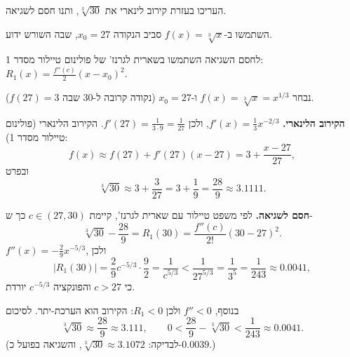 
\begin{question}
העריכו בעזרת קירוב לינארי את $\sqrt[3]{30}$, ותנו חסם לשגיאה.
\end{question}

\begin{hint}
השתמשו ב-$f(x)=\sqrt[3]{x}$ סביב הנקודה $x_0=27$, שבה השורש ידוע.
\end{hint}

\begin{hint}
לחסם השגיאה השתמשו בשארית לגרנז' של פולינום טיילור מסדר 1: $R_1(x)=\frac{f''(c)}{2}(x-x_0)^2$.
\end{hint}

\begin{solution}
נבחר $f(x)=\sqrt[3]{x}=x^{1/3}$ ו-$x_0=27$ (נקודה קרובה ל-$30$ שבה $f(27)=3$).

\textbf{הקירוב הלינארי.} $f'(x)=\frac13x^{-2/3}$, ולכן $f'(27)=\frac{1}{3\cdot 9}=\frac1{27}$. הקירוב הלינארי (פולינום טיילור מסדר 1):
\[ f(x)\approx f(27)+f'(27)(x-27)=3+\frac{x-27}{27}, \]
ובפרט
\[ \sqrt[3]{30}\approx 3+\frac{3}{27}=3+\frac19=\frac{28}{9}\approx 3.1111. \]

\textbf{חסם לשגיאה.} לפי משפט טיילור עם שארית לגרנז', קיימת $c\in(27,30)$ כך ש-
\[ \sqrt[3]{30}-\frac{28}{9} = R_1(30) = \frac{f''(c)}{2!}(30-27)^2. \]
$f''(x)=-\frac29x^{-5/3}$, ולכן
\[ |R_1(30)| = \frac{2}{9}c^{-5/3}\cdot\frac{9}{2} = \frac{1}{c^{5/3}} < \frac{1}{27^{5/3}}=\frac{1}{3^5}=\frac1{243}\approx 0.0041, \]
כי $c>27$ והפונקציה $c^{-5/3}$ יורדת.

בנוסף, $f''<0$ ולכן $R_1<0$: הקירוב הוא הערכת-יתר. לסיכום
\[ \boxed{\sqrt[3]{30}\approx\frac{28}{9}\approx3.111,\qquad 0<\frac{28}{9}-\sqrt[3]{30}<\frac{1}{243}\approx0.0041.} \]
(לבדיקה: $\sqrt[3]{30}\approx3.1072$, והשגיאה בפועל כ-$0.0039$.)
\end{solution}
